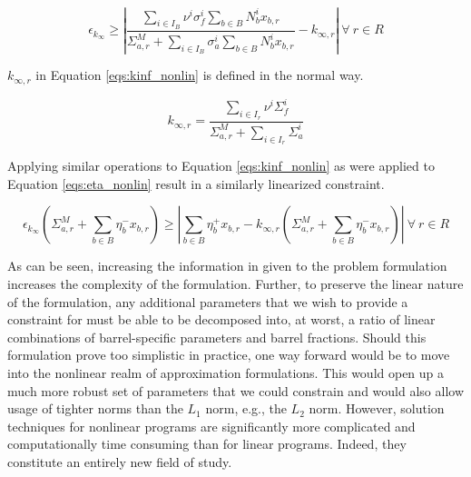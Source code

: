 \begin{equation}
\label{eqs:kinf_nonlin}
\epsilon_{k_{\infty}} \geq \left| 
\frac{\sum_{i \in I_{B}} \nu^{i} \sigma_{f}^{i} \sum_{b \in B} N_{b}^{i} x_{b,r}}
     {\Sigma_{a,r}^{M} + \sum_{i \in I_{B}} \sigma_{a}^{i} \sum_{b \in B} N_{b}^{i} x_{b,r}} 
- k_{\infty,r} \right|
\: \forall \: r \in R
\end{equation}

$k_{\infty,r}$ in Equation \ref{eqs:kinf_nonlin} is defined in the normal way.

\begin{equation}
\label{eqs:kinf_r}
k_{\infty,r} = \frac{\sum_{i \in I_{r}} \nu^{i} \Sigma_{f}^{i}}
                    {\Sigma_{a,r}^{M} + \sum_{i \in I_{r}} \Sigma_{a}^{i}}
\end{equation}

Applying similar operations to Equation \ref{eqs:kinf_nonlin} as were applied to
Equation \ref{eqs:eta_nonlin} result in a similarly linearized constraint.

\begin{equation}
\label{eqs:kinf_linear}
\epsilon_{k_{\infty}} \left( \Sigma_{a,r}^{M} + \sum_{b \in B} \eta_{b}^{-} x_{b,r} \right)
\geq
\left| \sum_{b \in B} \eta_{b}^{+} x_{b,r}
- k_{\infty,r}  \left( \Sigma_{a,r}^{M} + \sum_{b \in B} \eta_{b}^{-} x_{b,r} \right) \right|
\: \forall \: r \in R
\end{equation}

As can be seen, increasing the information in given to the problem formulation
increases the complexity of the formulation. Further, to preserve the linear
nature of the formulation, any additional parameters that we wish to provide a
constraint for must be able to be decomposed into, at worst, a ratio of linear
combinations of barrel-specific parameters and barrel fractions. Should this
formulation prove too simplistic in practice, one way forward would be to move
into the nonlinear realm of approximation formulations. This would open up a
much more robust set of parameters that we could constrain and would also allow
usage of tighter norms than the $L_1$ norm, e.g., the $L_2$ norm. However,
solution techniques for nonlinear programs are significantly more complicated
and computationally time consuming than for linear programs. Indeed, they
constitute an entirely new field of study.
